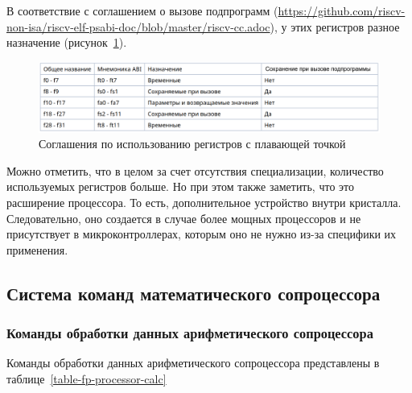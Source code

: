 
В соответствие с соглашением о вызове подпрограмм (\url{https://github.com/riscv-non-isa/riscv-elf-psabi-doc/blob/master/riscv-cc.adoc}), у этих регистров разное назначение (рисунок~\ref{fp-registers}).

\begin{figure}[htbp]
    \centering
    \includegraphics[width=1.0\textwidth]{img/fp-registers.png}
    \caption{Соглашения по использованию регистров с плавающей точкой}
    \label{fp-registers}
\end{figure}

Можно отметить, что в целом за счет отсутствия специализации, количество используемых регистров больше. Но при этом также заметить, что это расширение процессора. То есть, дополнительное устройство внутри кристалла. Следовательно, оно создается в случае более мощных процессоров и не присутствует в микроконтроллерах, которым оно не нужно из-за специфики их применения.

\subsection{Система команд математического сопроцессора}


\subsubsection{Команды обработки данных арифметического сопроцессора}
Команды обработки данных арифметического сопроцессора представлены в таблице~\ref{table-fp-processor-calc}

